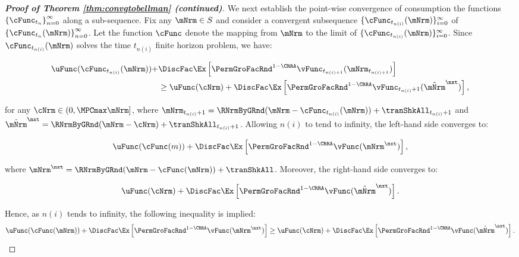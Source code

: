 \documentclass[\econtexRoot/BufferStockTheory]{subfiles}
\begin{document}
\begin{proof}[\textbf{Proof of Theorem \ref{thm:convgtobellman} (continued)}]
%
We next establish the point-wise convergence of consumption the functions $\left\{ \cFunc_{t_{n}}\right\}_{n=0}^{\infty}$ along a sub-sequence.
Fix any $\mNrm\in S$ and consider a convergent subsequence $\{\cFunc_{t_{n(i)}}(\mNrm)\}_{i=0}^{\infty}$ of $\left\{ \cFunc_{t_{n}}(\mNrm) \right\}_{n=0}^{\infty}$.
Let the function $\cFunc$ denote the mapping from $\mNrm$ to the limit of $\{\cFunc_{t_{n(i)}}(\mNrm)\}_{i=0}^{\infty}$.
Since $\cFunc_{t_{n(i)}}(\mNrm)$ solves the time $t_{n(i)}$ finite horizon problem, we have:

\begin{samepage}
\begin{equation}
\begin{split}
\uFunc(\cFunc_{t_{n(i)}}(\mNrm)) + & \DiscFac \Ex \left[ {\PermGroFacRnd}^{1 - \CRRA} \vFunc_{t_{n(i)+1}}(\mNrm_{t_{n(i)+1}}) \right] \\ 
& \geq \uFunc(\cNrm) + \DiscFac \Ex \left[ {\PermGroFacRnd}^{1 - \CRRA} \vFunc_{t_{n(i)}+1}(\hat{\mNrm}^{\nxt}) \right], 
\end{split}
\end{equation}
\end{samepage}
for any $\cNrm \in (0, \MPCmax \mNrm]$, where $\mNrm_{t_{n(i)}+1} = \RNrmByGRnd(\mNrm - \cFunc_{t_{n(i)}}(\mNrm)) + \tranShkAll_{t_{n(i)}+1}$ and $\hat{\mNrm}^{\nxt} = \RNrmByGRnd(\mNrm - \cNrm) + \tranShkAll_{t_{n(i)}+1}$.
%
Allowing $n(i)$ to tend to infinity, the left-hand side converges to:
 
\begin{equation}
\uFunc(\cFunc(m)) + \DiscFac \Ex \left[ {\PermGroFacRnd}^{1 - \CRRA} \vFunc(\mNrm^{\nxt}) \right],
\end{equation}

where $\mNrm^{\nxt} = \RNrmByGRnd(\mNrm - \cFunc(\mNrm)) + \tranShkAll$.
Moreover, the right-hand side converges to:

\begin{equation}
\uFunc(\cNrm) + \DiscFac \Ex \left[ {\PermGroFacRnd}^{1 - \CRRA} \vFunc(\hat{\mNrm}^{\nxt}) \right].
\end{equation}

Hence, as $n(i)$ tends to infinity, the following inequality is implied:
\begin{equation}
\uFunc(\cFunc(\mNrm)) + \DiscFac \Ex \left[ {\PermGroFacRnd}^{1 - \CRRA} \vFunc(\mNrm^{\nxt}) \right] \geq \uFunc(\cNrm) + \DiscFac \Ex \left[ {\PermGroFacRnd}^{1 - \CRRA} \vFunc(\hat{\mNrm}^{\nxt}) \right].
\end{equation}


\end{proof}
\end{document}
